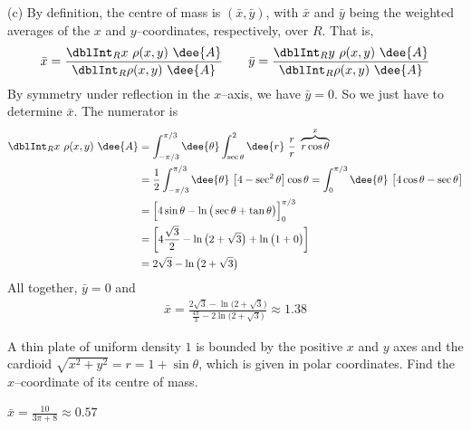 \begin{solution}
(c)
By definition, the centre of mass is $(\bar x, \bar y)$,
with $\bar x$ and $\bar y$ being the weighted averages  of the $x$ and 
$y$--coordinates, respectively, over $R$. That is,
\begin{align*}
\bar x = \frac{\dblInt_R x\ \rho(x,y)\ \dee{A}}{\dblInt_R \rho(x,y)\ \dee{A}}
\qquad
\bar y = \frac{\dblInt_R y\ \rho(x,y)\ \dee{A}}{\dblInt_R \rho(x,y)\ \dee{A}}
\end{align*}
By symmetry under reflection in the $x$--axis, we have $\bar y=0$.
So we just have to determine $\bar x$. 
The numerator is
\begin{align*}
\dblInt_R x\ \rho(x,y)\ \dee{A}
&=\int_{-\pi/3}^{\pi/3}\dee{\theta}\int_{\sec\theta}^2\dee{r}\ \frac{r}{r}\ 
       \overbrace{r\cos\theta}^{x} \\
&=\frac{1}{2}\int_{-\pi/3}^{\pi/3}\dee{\theta}\ \big[4-\sec^2\theta\big]
                               \cos\theta 
=\int_0^{\pi/3}\dee{\theta}\ \big[4\cos\theta-\sec\theta\big] \\
&= \Big[4\sin\theta - \ln\big(\sec\theta+\tan\theta\big)\Big]_0^{\pi/3} \\
&= \left[4\frac{\sqrt{3}}{2} - \ln\big(2+\sqrt{3}\big)
            + \ln\big(1+0\big)\right] \\
&=  2\sqrt{3}- \ln\big(2+\sqrt{3}\big)
\end{align*}
All together, $\bar y=0$ and
\begin{align*}
\bar x = \frac{2\sqrt{3}- \ln\big(2+\sqrt{3}\big)}
            {\frac{4\pi}{3} - 2\ln\big(2+\sqrt{3}\big)}
        \approx 1.38
\end{align*}
\end{solution}

\begin{question}[M200 2009D] %
A thin plate of uniform density $1$ is bounded by the positive $x$ and $y$ 
axes and the cardioid $\sqrt{x^2+y^2}=r=1+\sin\theta$, which is given
in polar coordinates. Find the $x$--coordinate of its centre of mass.
\end{question}

%

\begin{answer}
$\bar x = \frac{10}{3\pi+8} \approx 0.57$
\end{answer}

